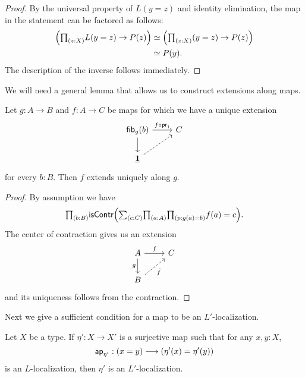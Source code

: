 \begin{proof}
By the universal property of $L(y=z)$ and identity elimination,
the map in the statement can be factored as follows:
\begin{align*}
\Big(\prd{z:X}L(y=z)\to P(z)\Big) & \simeq \Big(\prd{z:X}(y=z)\to P(z)\Big) \\
& \simeq P(y).
\end{align*}
The description of the inverse follows immediately.
\end{proof}

We will need a general lemma that allows us to construct extensions along maps.

\begin{lem}\label{lem:unique_extension}
Let $g:A\to B$ and $f:A\to C$ be maps for which we have a unique extension
\[
  \begin{tikzcd}
    \fib{g}{b} \arrow[r,"f\circ\proj 1"] \arrow[d] & C \\
    \unit \arrow[ur,dashed]
  \end{tikzcd}
\]
for every $b:B$.
Then $f$ extends uniquely along $g$.
\end{lem}

\begin{proof}
By assumption we have
\[
  \prd{b:B}\mathsf{isContr}\Big(\sm{c:C}\prd{a:A}{p:g(a)=b} f(a)=c\Big).
\]
The center of contraction gives us an extension
\[
  \begin{tikzcd}
    A \arrow[r,"f"] \arrow[d,swap,"g"] & C \\
    B \arrow[ur,dashed,swap,"\tilde{f}"]
  \end{tikzcd}
\]
and its uniqueness follows from the contraction.
\end{proof}

Next we give a sufficient condition for a map to be an $L'$-localization.

\begin{prop}\label{lemma:sufficientforlocalization}
Let $X$ be a type.
If $\eta': X \to X'$ is a surjective map such that for any $x,y:X$,
\[
  \mathsf{ap}_{\eta'}:(x=y) \longrightarrow (\eta'(x)=\eta'(y))
\]
is an $L$-localization, then $\eta'$ is an $L'$-localization.
\end{prop}

